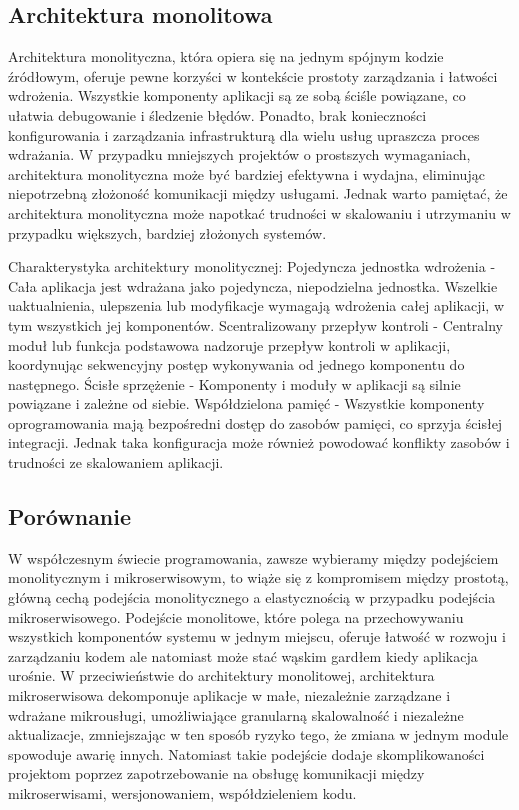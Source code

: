 \documentclass[runningheads,12pt]{llncs}
\begin{document}
\subsection{Architektura monolitowa}

Architektura monolityczna, która opiera się na jednym spójnym kodzie źródłowym, oferuje pewne korzyści w kontekście prostoty zarządzania i łatwości wdrożenia. Wszystkie komponenty aplikacji są ze sobą ściśle powiązane, co ułatwia debugowanie i śledzenie błędów. Ponadto, brak konieczności konfigurowania i zarządzania infrastrukturą dla wielu usług upraszcza proces wdrażania. W przypadku mniejszych projektów o prostszych wymaganiach, architektura monolityczna może być bardziej efektywna i wydajna, eliminując niepotrzebną złożoność komunikacji między usługami. Jednak warto pamiętać, że architektura monolityczna może napotkać trudności w skalowaniu i utrzymaniu w przypadku większych, bardziej złożonych systemów.

Charakterystyka architektury monolitycznej:
Pojedyncza jednostka wdrożenia - Cała aplikacja jest wdrażana jako pojedyncza, niepodzielna jednostka. Wszelkie uaktualnienia, ulepszenia lub modyfikacje wymagają wdrożenia całej aplikacji, w tym wszystkich jej komponentów.
Scentralizowany przepływ kontroli - Centralny moduł lub funkcja podstawowa nadzoruje przepływ kontroli w aplikacji, koordynując sekwencyjny postęp wykonywania od jednego komponentu do następnego.
Ścisłe sprzężenie - Komponenty i moduły w aplikacji są silnie powiązane i zależne od siebie.
Współdzielona pamięć - Wszystkie komponenty oprogramowania mają bezpośredni dostęp do zasobów pamięci, co sprzyja ścisłej integracji. Jednak taka konfiguracja może również powodować konflikty zasobów i trudności ze skalowaniem aplikacji.~\cite{sharma2023monolithic}

\subsection{Porównanie}

W współczesnym świecie programowania, zawsze wybieramy między podejściem monolitycznym i mikroserwisowym, to wiąże się z kompromisem między prostotą, główną cechą podejścia monolitycznego a elastycznością w przypadku podejścia mikroserwisowego. Podejście monolitowe, które polega na przechowywaniu wszystkich komponentów systemu w jednym miejscu, oferuje łatwość w rozwoju i zarządzaniu kodem ale natomiast może stać wąskim gardłem kiedy aplikacja urośnie. W przeciwieństwie do architektury monolitowej, architektura mikroserwisowa dekomponuje aplikacje w małe, niezależnie zarządzane i wdrażane mikrousługi, umożliwiające granularną skalowalność i niezależne aktualizacje, zmniejszając w ten sposób ryzyko tego, że zmiana w jednym module spowoduje awarię innych. Natomiast takie podejście dodaje skomplikowaności projektom poprzez zapotrzebowanie na obsługę komunikacji między mikroserwisami, wersjonowaniem, współdzieleniem kodu.
\end{document}
